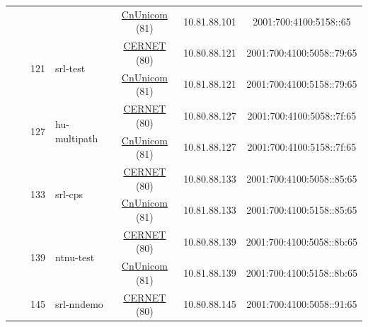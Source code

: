 \begin{small}
\begin{center}
\begin{longtable}{|c|c|c|c|c|c|c|c|}
  &  & \multicolumn{2}{|c|}{} & \multicolumn{2}{|c|}{\tiny{\href{http://www.chinaunicom.com}{CnUnicom} (81)}} & \tiny{10.81.88.101} & \tiny{2001:700:4100:5158::65} \\* \cline{3-3}\cline{4-4}\cline{5-5}\cline{6-6}\cline{7-7}\cline{8-8}
  &  & \multirow{2}{*}{\tiny{121}} & \multicolumn{1}{|l|}{\multirow{2}{*}{\tiny{srl-test}}} & \multicolumn{2}{|c|}{\tiny{\href{http://www.cernet.edu.cn}{CERNET} (80)}} & \tiny{10.80.88.121} & \tiny{2001:700:4100:5058::79:65} \\* \cline{5-5}\cline{6-6}\cline{7-7}\cline{8-8}
  &  &  &  & \multicolumn{2}{|c|}{\tiny{\href{http://www.chinaunicom.com}{CnUnicom} (81)}} & \tiny{10.81.88.121} & \tiny{2001:700:4100:5158::79:65} \\* \cline{3-3}\cline{4-4}\cline{5-5}\cline{6-6}\cline{7-7}\cline{8-8}
  &  & \multirow{2}{*}{\tiny{127}} & \multicolumn{1}{|l|}{\multirow{2}{*}{\tiny{hu-multipath}}} & \multicolumn{2}{|c|}{\tiny{\href{http://www.cernet.edu.cn}{CERNET} (80)}} & \tiny{10.80.88.127} & \tiny{2001:700:4100:5058::7f:65} \\* \cline{5-5}\cline{6-6}\cline{7-7}\cline{8-8}
  &  &  &  & \multicolumn{2}{|c|}{\tiny{\href{http://www.chinaunicom.com}{CnUnicom} (81)}} & \tiny{10.81.88.127} & \tiny{2001:700:4100:5158::7f:65} \\* \cline{3-3}\cline{4-4}\cline{5-5}\cline{6-6}\cline{7-7}\cline{8-8}
  &  & \multirow{2}{*}{\tiny{133}} & \multicolumn{1}{|l|}{\multirow{2}{*}{\tiny{srl-cps}}} & \multicolumn{2}{|c|}{\tiny{\href{http://www.cernet.edu.cn}{CERNET} (80)}} & \tiny{10.80.88.133} & \tiny{2001:700:4100:5058::85:65} \\* \cline{5-5}\cline{6-6}\cline{7-7}\cline{8-8}
  &  &  &  & \multicolumn{2}{|c|}{\tiny{\href{http://www.chinaunicom.com}{CnUnicom} (81)}} & \tiny{10.81.88.133} & \tiny{2001:700:4100:5158::85:65} \\* \cline{3-3}\cline{4-4}\cline{5-5}\cline{6-6}\cline{7-7}\cline{8-8}
  &  & \multirow{2}{*}{\tiny{139}} & \multicolumn{1}{|l|}{\multirow{2}{*}{\tiny{ntnu-test}}} & \multicolumn{2}{|c|}{\tiny{\href{http://www.cernet.edu.cn}{CERNET} (80)}} & \tiny{10.80.88.139} & \tiny{2001:700:4100:5058::8b:65} \\* \cline{5-5}\cline{6-6}\cline{7-7}\cline{8-8}
  &  &  &  & \multicolumn{2}{|c|}{\tiny{\href{http://www.chinaunicom.com}{CnUnicom} (81)}} & \tiny{10.81.88.139} & \tiny{2001:700:4100:5158::8b:65} \\* \cline{3-3}\cline{4-4}\cline{5-5}\cline{6-6}\cline{7-7}\cline{8-8}
  &  & \multirow{2}{*}{\tiny{145}} & \multicolumn{1}{|l|}{\multirow{2}{*}{\tiny{srl-nndemo}}} & \multicolumn{2}{|c|}{\tiny{\href{http://www.cernet.edu.cn}{CERNET} (80)}} & \tiny{10.80.88.145} & \tiny{2001:700:4100:5058::91:65} \\* \cline{5-5}\cline{6-6}\cline{7-7}\cline{8-8}

\end{longtable}
\end{center}
\end{small}
